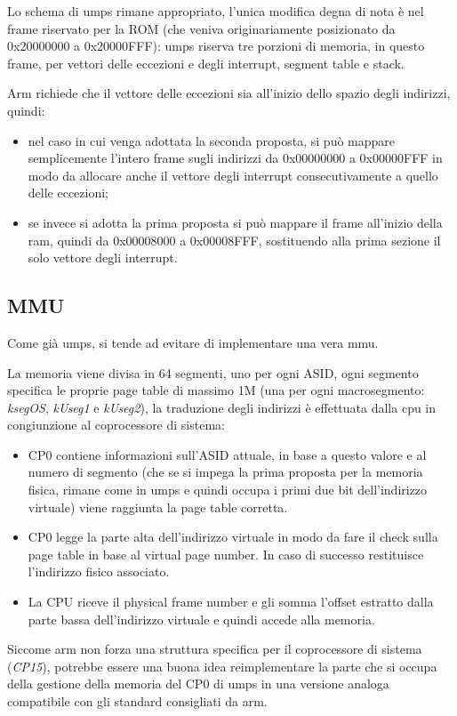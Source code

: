 \documentclass[a4paper,12pt]{article}
\newenvironment{lista}{\begin{itemize}\itemsep0pt \parskip0pt}{\end{itemize}}
\begin{document}
Lo schema di umps rimane appropriato, l'unica modifica degna di nota \`e nel frame riservato per la ROM (che veniva originariamente posizionato da 0x20000000 a 0x20000FFF): umps riserva tre porzioni di memoria, in questo frame, per vettori delle eccezioni e degli interrupt, segment table e stack.

Arm richiede che il vettore delle eccezioni sia all'inizio dello spazio degli indirizzi, quindi:
\begin{lista}
\item nel caso in cui venga adottata la seconda proposta, si pu\`o mappare semplicemente l'intero frame sugli indirizzi da 0x00000000 a 0x00000FFF in modo da allocare anche il vettore degli interrupt consecutivamente a quello delle eccezioni; 
\item se invece si adotta la prima proposta si pu\`o mappare il frame all'inizio della ram, quindi da 0x00008000 a 0x00008FFF, sostituendo alla prima sezione il solo vettore degli interrupt.
\end{lista}

\subsection{MMU}

Come gi\`a umps, si tende ad evitare di implementare una vera mmu.

La memoria viene divisa in 64 segmenti, uno per ogni ASID, ogni segmento specifica le proprie page table di massimo 1M (una per ogni macrosegmento: \emph{ksegOS}, \emph{kUseg1} e \emph{kUseg2}), la traduzione degli indirizzi \`e effettuata dalla cpu in congiunzione al coprocessore di sistema:

\begin{itemize}
\item CP0 contiene informazioni sull'ASID attuale, in base a questo valore e al numero di segmento (che se si impega la prima proposta per la memoria fisica, rimane come in umps e quindi occupa i primi due bit dell'indirizzo virtuale) viene raggiunta la page table corretta. 
\item CP0 legge la parte alta dell'indirizzo virtuale in modo da fare il check sulla page table in base al virtual page number. In caso di successo restituisce l'indirizzo fisico associato.
\item La CPU riceve il physical frame number e gli somma l'offset estratto dalla parte bassa dell'indirizzo virtuale e quindi accede alla memoria.
\end{itemize}

Siccome arm non forza una struttura specifica per il coprocessore di sistema (\emph{CP15}), potrebbe essere una buona idea reimplementare la parte che si occupa della gestione della memoria del CP0 di umps in una versione analoga compatibile con gli standard consigliati da arm.
\end{document}
